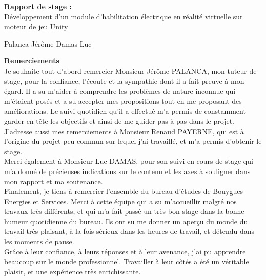 \documentclass[a4paper]{article}
\begin{document}
    \vfill 
    \begin{center}
		\Huge{\textbf{Rapport de stage : }} \\
        \vspace{20pt}
        \Large{Développement d'un module d'habilitation électrique en réalité virtuelle sur moteur de jeu Unity}
        
	\end{center}
    \vfill 
    
    Palanca Jérôme  \hfill Damas Luc

 	\newpage 
    \huge \textbf{Remerciements} \vspace{10pt} \\

    \normalsize
    Je souhaite tout d'abord remercier Monsieur Jérôme PALANCA, mon tuteur de stage, pour la confiance, l'écoute et la sympathie dont il a fait preuve à mon égard. Il a su m'aider à comprendre les problèmes de nature inconnue qui m'étaient posés et a su accepter mes propositions tout en me proposant des améliorations. Le suivi quotidien qu'il a effectué m'a permis de constamment garder en tête les objectifs et ainsi de me guider pas à pas dans le projet. \vspace{10pt} \\

    J'adresse aussi mes remerciements à Monsieur Renaud PAYERNE, qui est à l'origine du projet peu commun sur lequel j'ai travaillé, et m'a permis d'obtenir le stage. \vspace{10pt} \\
	Merci également à Monsieur Luc DAMAS, pour son suivi en cours de stage qui m'a donné de précieuses indications sur le contenu et les axes à souligner dans mon rapport et ma soutenance. \vspace{10pt} \\

    Finalement, je tiens à remercier l'ensemble du bureau d'études de Bouygues Energies et Services. Merci à cette équipe qui a su m'accueillir malgré nos travaux très différents, et qui m'a fait passé un très bon stage dans la bonne humeur quotidienne du bureau. Ils ont su me donner un aperçu du monde du travail très plaisant, à la fois sérieux dans les heures de travail, et détendu dans les moments de pause. \vspace{10pt} \\

    Grâce à leur confiance, à leurs réponses et à leur avenance, j'ai pu apprendre beaucoup sur le monde professionnel. Travailler à leur côtés a été un véritable plaisir, et une expérience très enrichissante. \\
    
\end{document}
